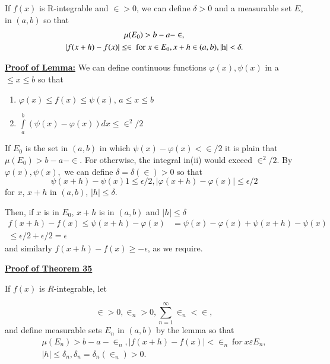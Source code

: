 \begin{lemma*}
If $f(x)$ is R-integrable and  $ \in > 0$, we can define
 $ \delta >0$ and a measurable set $E_\circ$ in $(a,b)$ so that
 \begin{gather*} 
   \mu (E_0)> b-a-\in, \\
   |f( x+ h)-f( x)|\leq \in  ~\text{for}~ x \in E_0, x+h \in
   (a,b),|\rm h| < \delta.
 \end{gather*}
\end{lemma*}

\noindent \textbf{\underline {Proof of Lemma:}} We can define
continuous functions $ \varphi(x),\psi (x)$  
in a $\leq x \leq b$ so that
\begin{enumerate}
\renewcommand{\theenumi}{\roman{enumi}}
\renewcommand{\labelenumi}{(\theenumi)}
\item $\varphi (x)\leq  f(x)\leq  \psi (x)$, $a\leq  x \leq  b$
\item $\int\limits^b_a (\psi (x)-\varphi (x)) dx \leq  \in^2/2 $
\end{enumerate}

If $E_0$ is the set in $(a,b)$ in which $\psi (x)- \varphi (x) < \in/2 $
it is plain that $ \mu (E_0) > b-a-\in.$ For otherwise, the integral 
in(ii) would exceed $\in^2/2$. By
$\varphi (x), \psi (x),$ 
we can define $\delta = \delta (\in) > 0$ so that
$$ 
\psi (x + h)-\psi (x) 1 \leq  \epsilon/2, |\varphi
(x+h)-\varphi(x)|\leq  \epsilon/2 
$$
for $x$, $x+h$ in $(a,b)$, $|h | \leq  \delta$.

Then, if $x$ is in $E_0$, $x+h$ is in $(a,b)$ and $|h |\leq  \delta$ 
\begin{align*}
  f(x+ h) -f(x) \leq  \psi (x+h) - \varphi(x)& = \psi (x)- \varphi (x)+
  \psi (x+h)-\psi(x)\\ 
  \leq  \epsilon/2 + \epsilon/2=\epsilon 
\end{align*}
and similarly $f(x+h)- f (x)\geq  - \epsilon $, as we require.

\noindent \textbf{\underline {Proof of Theorem 35}}\pageoriginale

If $f(x)$ is $R$-integrable, let

$$
\in > 0, \in_n >0, \sum^\infty_{n=1}\in_n < \in ,
$$
and define measurable sets $E_n$ in $(a,b)$ by the lemma so that 
\begin{multline*}
\mu (E_n)>b-a-\in_n,|f(x+ h)-f(x)|<\in_n ~\text{fo}r ~ x \varepsilon
E_n,\\ 
| h| \leq  \delta_n,\delta_n=\delta_n (\in_n)>0.
\end{multline*}

